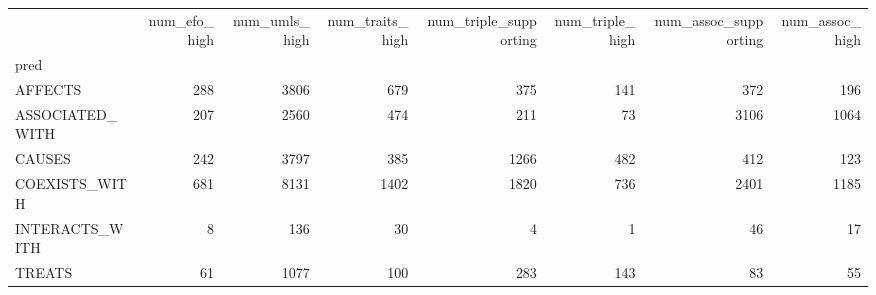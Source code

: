 \begin{tabular}{lrrrrrrr}
 & num_efo_high & num_umls_high & num_traits_high & num_triple_supporting & num_triple_high & num_assoc_supporting & num_assoc_high \\
pred &  &  &  &  &  &  &  \\
AFFECTS & 288 & 3806 & 679 & 375 & 141 & 372 & 196 \\
ASSOCIATED_WITH & 207 & 2560 & 474 & 211 & 73 & 3106 & 1064 \\
CAUSES & 242 & 3797 & 385 & 1266 & 482 & 412 & 123 \\
COEXISTS_WITH & 681 & 8131 & 1402 & 1820 & 736 & 2401 & 1185 \\
INTERACTS_WITH & 8 & 136 & 30 & 4 & 1 & 46 & 17 \\
TREATS & 61 & 1077 & 100 & 283 & 143 & 83 & 55 \\
\end{tabular}
